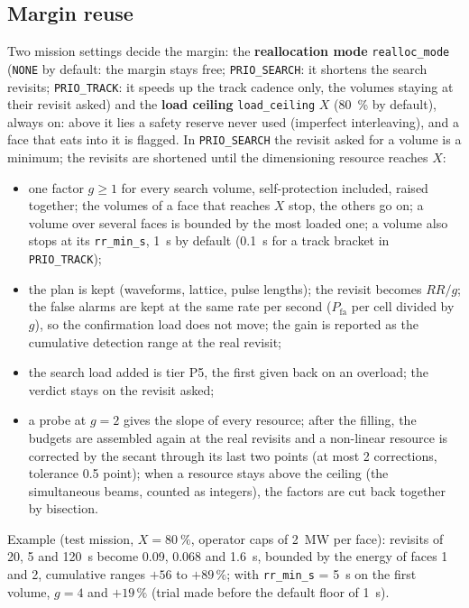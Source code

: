 \documentclass[11pt,a4paper]{article}
\newcommand{\code}[1]{\texttt{\small #1}}
\newcommand{\Pfa}{P_{\mathrm{fa}}}
\begin{document}
\subsection{Margin reuse}
Two mission settings decide the margin: the \textbf{reallocation mode} \code{realloc\_mode} (\code{NONE} by default:
the margin stays free; \code{PRIO\_SEARCH}: it shortens the search revisits; \code{PRIO\_TRACK}: it speeds up the track
cadence only, the volumes staying at their revisit asked) and the \textbf{load ceiling} \code{load\_ceiling} $X$
(\SI{80}{\percent} by default), always on: above it lies a safety reserve never used (imperfect interleaving), and a
face that eats into it is flagged. In \code{PRIO\_SEARCH} the revisit asked for a volume is a minimum; the revisits are
shortened until the dimensioning resource reaches $X$:
\begin{itemize}
  \item one factor $g \ge 1$ for every search volume, self-protection included, raised together; the volumes of a face
        that reaches $X$ stop, the others go on; a volume over several faces is bounded by the most loaded one; a
        volume also stops at its \code{rr\_min\_s}, \SI{1}{s} by default (\SI{0.1}{s} for a track bracket in
        \code{PRIO\_TRACK});
  \item the plan is kept (waveforms, lattice, pulse lengths); the revisit becomes $RR/g$; the false alarms are kept at
        the same rate per second ($\Pfa$ per cell divided by $g$), so the confirmation load does not move; the gain is
        reported as the cumulative detection range at the real revisit;
  \item the search load added is tier P5, the first given back on an overload; the verdict stays on the revisit asked;
  \item a probe at $g = 2$ gives the slope of every resource; after the filling, the budgets are assembled again at the
        real revisits and a non-linear resource is corrected by the secant through its last two points (at most 2
        corrections, tolerance 0.5 point); when a resource stays above the ceiling (the simultaneous beams, counted
        as integers), the factors are cut back together by bisection.
\end{itemize}
Example (test mission, $X = \SI{80}{\percent}$, operator caps of \SI{2}{MW} per face): revisits of 20, 5 and
\SI{120}{s} become 0.09, 0.068 and \SI{1.6}{s}, bounded by the energy of faces 1 and 2, cumulative ranges
$+56$ to $+89\,\%$; with \code{rr\_min\_s} = \SI{5}{s} on the first volume, $g = 4$ and $+19\,\%$ (trial made before
the default floor of \SI{1}{s}).
\end{document}
